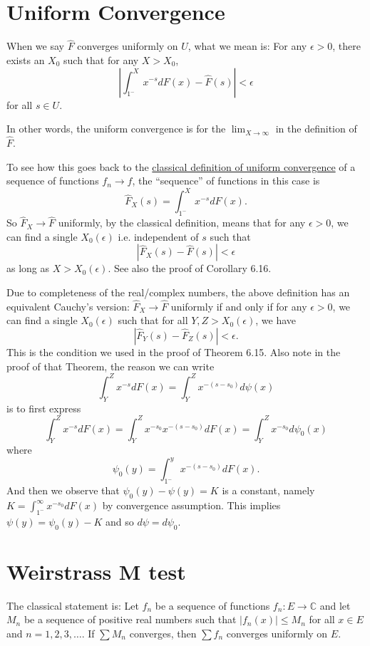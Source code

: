 \documentclass[12pt]{article}
\newcommand{\Fhat}{\widehat{F}}
\newcommand{\Abs}[1]{\left| #1 \right|}
\begin{document}
\fi

\section{Uniform Convergence}

When we say $\Fhat$ converges uniformly on $U$, what we mean is: For any $\epsilon > 0$, there exists an $X_0$ such that for any $X > X_0$,
$$\Abs{\int_{1^-}^X x^{-s} dF(x) - \Fhat(s)} < \epsilon$$
for all $s \in U$.

In other words, the uniform convergence is for the $\lim_{X \rightarrow \infty}$ in the definition of $\Fhat$.

To see how this goes back to the \href{https://en.wikipedia.org/wiki/Uniform\_convergence}{classical definition of uniform convergence} of a sequence of functions $f_n \rightarrow f$, the ``sequence'' of functions in this case is
$$\Fhat_X(s) = \int_{1^-}^X x^{-s} dF(x).$$
So $\Fhat_X \rightarrow \Fhat$ uniformly, by the classical definition, means that for any $\epsilon > 0$, we can find a single $X_0(\epsilon)$ i.e. independent of $s$ such that
$$\Abs{ \Fhat_X(s) - \Fhat(s) } < \epsilon$$
as long as $X > X_0(\epsilon)$. See also the proof of Corollary 6.16.

Due to completeness of the real/complex numbers, the above definition has an equivalent Cauchy's version: $\Fhat_X \rightarrow \Fhat$ uniformly if and only if for any $\epsilon > 0$, we can find a single $X_0(\epsilon)$ such that for all $Y, Z > X_0(\epsilon)$, we have
$$\Abs{ \Fhat_Y(s) - \Fhat_Z(s) } < \epsilon.$$
This is the condition we used in the proof of Theorem 6.15. Also note in the proof of that Theorem, the reason we can write
$$\int_Y^Z x^{-s} dF(x) = \int_Y^Z x^{-(s-s_0)} d\psi(x)$$
is to first express
$$\int_Y^Z x^{-s} dF(x) = \int_Y^Z x^{-s_0} x^{-(s-s_0)} dF(x) = \int_Y^Z x^{-s_0} d\psi_0(x)$$
where 
$$\psi_0(y) = \int_{1^-}^y x^{-(s-s_0)} dF(x).$$
And then we observe that $\psi_0(y) - \psi(y) = K$ is a constant, namely $K = \int_{1^-}^{\infty} x^{-s_0} dF(x)$ by convergence assumption. This implies $\psi(y) = \psi_0(y) - K$ and so $d\psi = d\psi_0$.

\section{Weirstrass M test}

The classical statement is: Let $f_n$ be a sequence of functions $f_n: E \to \mathbb {C}$ and let $M_n$ be a sequence of positive real numbers such that $|f_n(x)|\leq M_{n}$ for all $x \in E$ and $n = 1, 2, 3, \ldots$. If $\sum M_n$ converges, then $\sum f_n$ converges uniformly on $E$.
\end{document}

